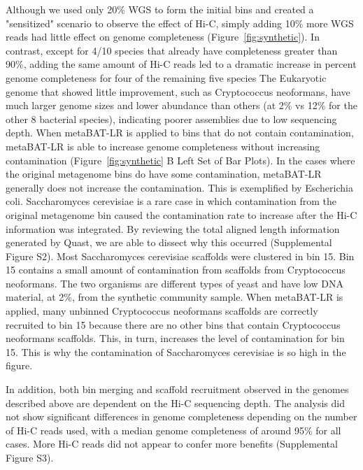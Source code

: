 \documentclass[fleqn,10pt,lineno]{wlpeerj}
\begin{document}
Although we used only 20\% WGS to form the initial bins and created a "sensitized" scenario to observe the effect of Hi-C, simply adding 10\% more WGS reads had little effect on genome completeness (Figure~\ref{fig:synthetic}). In contrast, except for 4/10 species that already have completeness greater than 90\%, adding the same amount of Hi-C reads led to a dramatic increase in percent genome completeness for four of the remaining five species  The Eukaryotic genome that showed little improvement, such as Cryptococcus neoformans, have much larger genome sizes and lower abundance than others (at 2\% vs 12\% for the other 8 bacterial species), indicating poorer assemblies due to low sequencing depth. When metaBAT-LR is applied to bins that do not contain contamination, metaBAT-LR is able to increase genome completeness without increasing contamination (Figure~\ref{fig:synthetic} B Left Set of Bar Plots). In the cases where the original metagenome bins do have some contamination, metaBAT-LR generally does not increase the contamination. This is exemplified by Escherichia coli. Saccharomyces cerevisiae is a rare case in which contamination from the original metagenome bin caused the contamination rate to increase after the Hi-C information was integrated. By reviewing the total aligned length information generated by Quast, we are able to dissect why this occurred (Supplemental Figure S2). Most Saccharomyces cerevisiae scaffolds were clustered in bin 15. Bin 15 contains a small amount of contamination from scaffolds from Cryptococcus neoformans. The two organisms are different types of yeast and have low DNA material, at 2\%, from the synthetic community sample. When metaBAT-LR is applied, many unbinned Cryptococcus neoformans scaffolds are correctly recruited to bin 15 because there are no other bins that contain Cryptococcus neoformans scaffolds. This, in turn, increases the level of contamination for bin 15. This is why the contamination of Saccharomyces cerevisiae is so high in the figure.


In addition, both bin merging and scaffold recruitment observed in the genomes described above are dependent on the Hi-C sequencing depth. The analysis did not show significant differences in genome completeness depending on the number of Hi-C reads used, with a median genome completeness of around 95\% for all cases.  
More Hi-C reads did not appear to confer more benefits (Supplemental Figure S3).   
\end{document}

